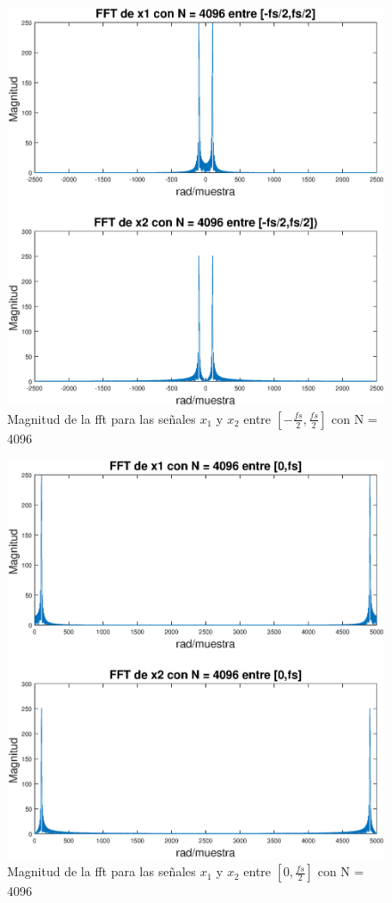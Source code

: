 \begin{enumerate}
    
    \begin{figure}[H]
        \centering
        \includegraphics[scale = 0.6]{Figuras/p1_2-fs-medios.eps}
        \caption{Magnitud de la fft para las señales $x_1$ y $x_2$ entre   $[-\frac{fs}{2},\frac{fs}{2}]$ con N = 4096}
        \label{fs-medios}
    \end{figure}
    
        \begin{figure}[H]
        \centering
        \includegraphics[scale = 0.6]{Figuras/p1_2-cero-fs-medio.eps}
        \caption{Magnitud de la fft para las señales $x_1$ y $x_2$ entre   $[0,\frac{fs}{2}]$ con N = 4096}
        \label{cero-fs-medio}
    \end{figure}



\end{enumerate}
